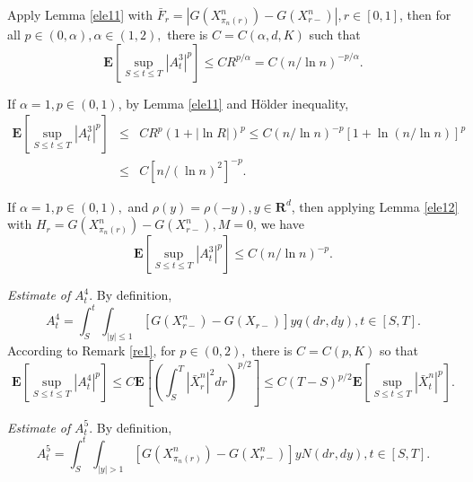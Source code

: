 \documentclass[11pt]{amsart}
\theoremstyle{plain}
\numberwithin{equation}{section}
\begin{document}
Apply Lemma \ref{ele11} with $\bar{F}_{r}=\left\vert G\left( X_{\pi
_{n}\left( r\right) }^{n}\right) -G\left( X_{r-}^{n}\right) \right\vert
,r\in \left[ 0,1\right] $, then for all $p\in \left( 0,\alpha \right)
,\alpha \in \left( 1,2\right) ,$ there is $C=C\left( \alpha ,d,K\right) $
such that 
\begin{equation*}
\mathbf{E}\left[ \sup_{S\leq t\leq T}\left\vert A_{t}^{3}\right\vert ^{p} \right] \leq C R^{p/\alpha }=C \left( n/\ln n\right) ^{-p/\alpha }.
\end{equation*}

If $\alpha =1,p\in \left( 0,1\right) $, by Lemma \ref{ele11} and H\"{o}lder
inequality, 
\begin{eqnarray*}
\mathbf{E}\left[ \sup_{S\leq t\leq T}\left\vert A_{t}^{3}\right\vert ^{p}\right]&\leq &C R^{p}\left( 1+\left\vert\ln R\right\vert\right) ^{p} \leq C
\left( n/\ln n\right) ^{-p}[1+\ln \left( n/\ln n\right) ]^p \\
& \leq& C \left[ n/\left( \ln n\right) ^{2}\right] ^{-p}.
\end{eqnarray*}

If $\alpha =1,p\in \left( 0,1\right), $ and $\rho \left( y\right) =\rho
\left( -y\right) ,y\in \mathbf{R}^{d}$, then applying Lemma \ref{ele12} with 
$H_{r}= G\left( X_{\pi_{n}\left( r\right) }^{n}\right) -G\left(
X_{r-}^{n}\right) ,M=0$, we have 
\begin{equation*}
\mathbf{E}\left[ \sup_{S\leq t\leq T}\left\vert A_{t}^{3}\right\vert ^{p}\right] \leq C\left( n/\ln n\right) ^{-p}.
\end{equation*}

\emph{Estimate of }$A_t^{4}.$ By definition, 
\begin{equation*}
A_{t}^{4}=\int_{S}^{t}\int_{\left\vert y\right\vert \leq 1}\left[ G\left(
X_{r-}^{n}\right) -G\left( X_{r-}\right) \right] yq\left( dr,dy\right) ,t\in \left[ S,T\right] .
\end{equation*}According to Remark \ref{re1}, for $p\in \left( 0,2\right) ,$ there is $C=C\left( p,K\right) $ so that\begin{equation*}
\mathbf{E}\left[ \sup_{S\leq t\leq T}\left\vert A_{t}^{4}\right\vert ^{p}\right] \leq C\mathbf{E}\left[ \left( \int_{S}^{T}\left\vert \bar{X}_{r}^{n}\right\vert ^{2}dr\right) ^{p/2}\right] \leq C\left( T-S\right)
^{p/2}\mathbf{E}\left[ \sup_{S\leq t\leq T}\left\vert \bar{X}_{t}^{n}\right\vert ^{p}\right] .
\end{equation*}

\emph{Estimate of }$A_t^{5}.$ By definition,\begin{equation*}
A_{t}^{5}=\int_{S}^{t}\int_{\left\vert y\right\vert >1}[G\left( X_{\pi
_{n}\left( r\right) }^{n}\right) -G\left( X_{r-}^{n}\right) ]yN\left(
dr,dy\right) ,t\in \left[ S,T\right] .
\end{equation*}
\end{document}
